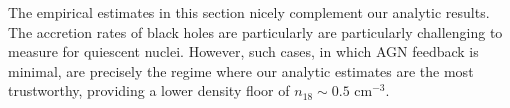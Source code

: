 \documentclass[usenatbib,fleqn]{mnras}
\newcommand\lsim{\mathrel{\rlap{\lower4pt\hbox{\hskip1pt$\sim$}}
    \raise1pt\hbox{$<$}}}
\newcommand\gsim{\mathrel{\rlap{\lower4pt\hbox{\hskip1pt$\sim$}}
    \raise1pt\hbox{$>$}}}
\newcommand{\Mbh}[1][]{M_{\bullet1}}
\newcommand{\Msun}{{\rm M_\odot}}
\begin{document}


The empirical estimates in this section nicely complement our analytic
results.  The accretion rates of black holes are particularly are
particularly challenging to measure for quiescent nuclei.  However,
such cases, in which AGN feedback is minimal, are precisely the regime
where our analytic estimates are the most trustworthy, providing a
lower density floor of $n_{18} \sim 0.5$ cm$^{-3}$.




\end{document}
